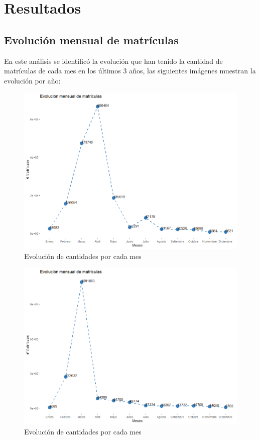 \chapter{Resultados} %
\label{Chapter3 } %

\section{Evolución mensual de matrículas}

En este análisis se identificó la evolución que han tenido la cantidad de matrículas de cada mes en los últimos 3 años, las siguientes imágenes muestran la evolución por año:

\begin{figure}[th]
\centering
\includegraphics[width=1.2\textwidth]{Figures/matriculas2020}
\decoRule
\caption[Matrículas 2020]{Evolución de cantidades por cada mes}
\label{fig:matriculas2020}
\end{figure}

\begin{figure}[th]
\centering
\includegraphics[width=1.2\textwidth]{Figures/matriculas2021}
\decoRule
\caption[Matrículas 2021]{Evolución de cantidades por cada mes}
\label{fig:matriculas2021}
\end{figure}


